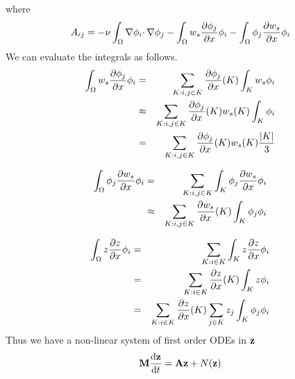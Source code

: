 \documentclass[12pt]{article}
\begin{document}
where
\[
A_{ij} = -\nu \int_\Omega \nabla \phi_i \cdotp \nabla \phi_j - \int_\Omega w_s \frac{\partial \phi_j}{\partial x} \phi_i - \int_\Omega \phi_j \frac{\partial w_s}{\partial x} \phi_i
\]
We can evaluate the integrals as follows.
\begin{eqnarray*}
\int_\Omega w_s \frac{\partial \phi_j}{\partial x} \phi_i &=& \sum_{K : i,j \in K} \frac{\partial \phi_j}{\partial x}(K) \int_K w_s \phi_i \\
&\approx& \sum_{K : i,j \in K} \frac{\partial \phi_j}{\partial x}(K) w_s(K) \int_K \phi_i \\
&=& \sum_{K : i,j \in K} \frac{\partial \phi_j}{\partial x}(K) w_s(K) \frac{|K|}{3}
\end{eqnarray*}

\begin{eqnarray*}
\int_\Omega \phi_j \frac{\partial w_s}{\partial x} \phi_i &=& \sum_{K : i,j \in K} \int_K \phi_j \frac{\partial w_s}{\partial x} \phi_i \\
&\approx& \sum_{K : i,j \in K} \frac{\partial w_s}{\partial x}(K) \int_K \phi_j  \phi_i
\end{eqnarray*}

\begin{eqnarray*}
\int_\Omega z \frac{\partial z}{\partial x} \phi_i &=& \sum_{K : i \in K} \int_K z \frac{\partial z}{\partial x} \phi_i \\
&=& \sum_{K : i \in K} \frac{\partial z}{\partial x}(K) \int_K z \phi_i \\
&=& \sum_{K : i \in K} \frac{\partial z}{\partial x}(K) \sum_{j \in K} z_j \int_K \phi_j \phi_i 
\end{eqnarray*}
Thus we have a non-linear system of first order ODEs in ${\mathbf z}$
\begin{eqnarray*}
 {\mathbf M} \frac{\textrm{d} {\mathbf z}}{\textrm{d} t} = {\mathbf A} {\mathbf z} + N({\mathbf z}) 
\end{eqnarray*}





\end{document}
